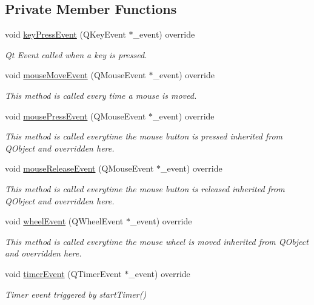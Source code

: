 \subsection*{Private Member Functions}
\begin{DoxyCompactItemize}
\item 
void \hyperlink{class_n_g_l_scene_a3335e6b631a608340dee63df69a8fb53}{key\+Press\+Event} (Q\+Key\+Event $\ast$\+\_\+event) override
\begin{DoxyCompactList}\small\item\em Qt Event called when a key is pressed. \end{DoxyCompactList}\item 
void \hyperlink{class_n_g_l_scene_af4ebd25d546f7af496dfda6a2d3d7c2b}{mouse\+Move\+Event} (Q\+Mouse\+Event $\ast$\+\_\+event) override
\begin{DoxyCompactList}\small\item\em This method is called every time a mouse is moved. \end{DoxyCompactList}\item 
void \hyperlink{class_n_g_l_scene_ad0df7ecbbd8f9537f66793c88b9fd831}{mouse\+Press\+Event} (Q\+Mouse\+Event $\ast$\+\_\+event) override
\begin{DoxyCompactList}\small\item\em This method is called everytime the mouse button is pressed inherited from Q\+Object and overridden here. \end{DoxyCompactList}\item 
void \hyperlink{class_n_g_l_scene_a04223f1f8b96093e9606539ac0fc89c5}{mouse\+Release\+Event} (Q\+Mouse\+Event $\ast$\+\_\+event) override
\begin{DoxyCompactList}\small\item\em This method is called everytime the mouse button is released inherited from Q\+Object and overridden here. \end{DoxyCompactList}\item 
void \hyperlink{class_n_g_l_scene_a8c32596b941a6a38515378e309ee6f02}{wheel\+Event} (Q\+Wheel\+Event $\ast$\+\_\+event) override
\begin{DoxyCompactList}\small\item\em This method is called everytime the mouse wheel is moved inherited from Q\+Object and overridden here. \end{DoxyCompactList}\item 
void \hyperlink{class_n_g_l_scene_adaf5940c83dc00d8a9960bab5e6914c0}{timer\+Event} (Q\+Timer\+Event $\ast$\+\_\+event) override
\begin{DoxyCompactList}\small\item\em Timer event triggered by start\+Timer() \end{DoxyCompactList}\end{DoxyCompactItemize}
